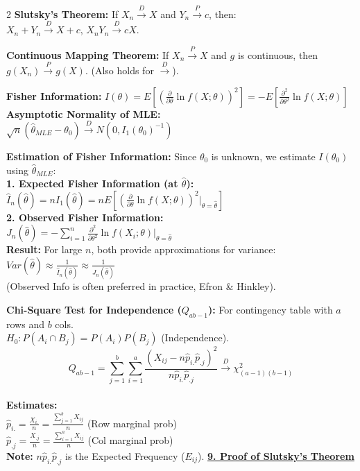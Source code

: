 \documentclass{article}
\newcommand{\sectiontitle}[1]{\vspace{0.1cm}\textbf{\underline{#1}}\vspace{0.1cm}}
\newcommand{\distname}[1]{\textbf{#1}}
\begin{document}
\begin{multicols*}{2}
\distname{Slutsky's Theorem:}
If $X_n \xrightarrow{D} X$ and $Y_n \xrightarrow{P} c$, then:
\\ $X_n + Y_n \xrightarrow{D} X+c$, \quad $X_n Y_n \xrightarrow{D} cX$.

\distname{Continuous Mapping Theorem:}
If $X_n \xrightarrow{P} X$ and $g$ is continuous, then $g(X_n) \xrightarrow{P} g(X)$. (Also holds for $\xrightarrow{D}$).

\distname{Fisher Information:}
$I(\theta) = E\left[ \left( \frac{\partial}{\partial \theta} \ln f(X;\theta) \right)^2 \right] = -E\left[ \frac{\partial^2}{\partial \theta^2} \ln f(X;\theta) \right]$
\\ \textbf{Asymptotic Normality of MLE:}
\\ $\sqrt{n}(\hat{\theta}_{MLE} - \theta_0) \xrightarrow{D} N(0, I_1(\theta_0)^{-1})$

\distname{Estimation of Fisher Information:}
Since $\theta_0$ is unknown, we estimate $I(\theta_0)$ using $\hat{\theta}_{MLE}$:
\\ \textbf{1. Expected Fisher Information (at $\hat{\theta}$):}
\\ $\hat{I}_n(\hat{\theta}) = n I_1(\hat{\theta}) = n E\left[ \left( \frac{\partial}{\partial \theta} \ln f(X;\theta) \right)^2 \bigg|_{\theta=\hat{\theta}} \right]$
\\ \textbf{2. Observed Fisher Information:}
\\ $J_n(\hat{\theta}) = -\sum_{i=1}^n \frac{\partial^2}{\partial \theta^2} \ln f(X_i; \theta) \bigg|_{\theta=\hat{\theta}}$
\\ \textbf{Result:} For large $n$, both provide approximations for variance:
\\ $Var(\hat{\theta}) \approx \frac{1}{\hat{I}_n(\hat{\theta})} \approx \frac{1}{J_n(\hat{\theta})}$
\\ (Observed Info is often preferred in practice, Efron \& Hinkley).

\distname{Chi-Square Test for Independence ($Q_{ab-1}$):}
For contingency table with $a$ rows and $b$ cols.
\\ $H_0: P(A_i \cap B_j) = P(A_i)P(B_j)$ (Independence).
\\[-0.2cm]
\[ Q_{ab-1} = \sum_{j=1}^{b}\sum_{i=1}^{a}\frac{(X_{ij}-n\hat{p}_{i.}\hat{p}_{.j})^{2}}{n\hat{p}_{i.}\hat{p}_{.j}} \xrightarrow{D} \chi^2_{(a-1)(b-1)} \]
\\[-0.4cm]
\textbf{Estimates:}
\\ $\hat{p}_{i.} = \frac{X_{i.}}{n} = \frac{\sum_{j=1}^b X_{ij}}{n}$ (Row marginal prob)
\\ $\hat{p}_{.j} = \frac{X_{.j}}{n} = \frac{\sum_{i=1}^a X_{ij}}{n}$ (Col marginal prob)
\\ \textbf{Note:} $n\hat{p}_{i.}\hat{p}_{.j}$ is the Expected Frequency ($E_{ij}$).
\sectiontitle{9. Proof of Slutsky's Theorem}


\end{multicols*}
\end{document}
